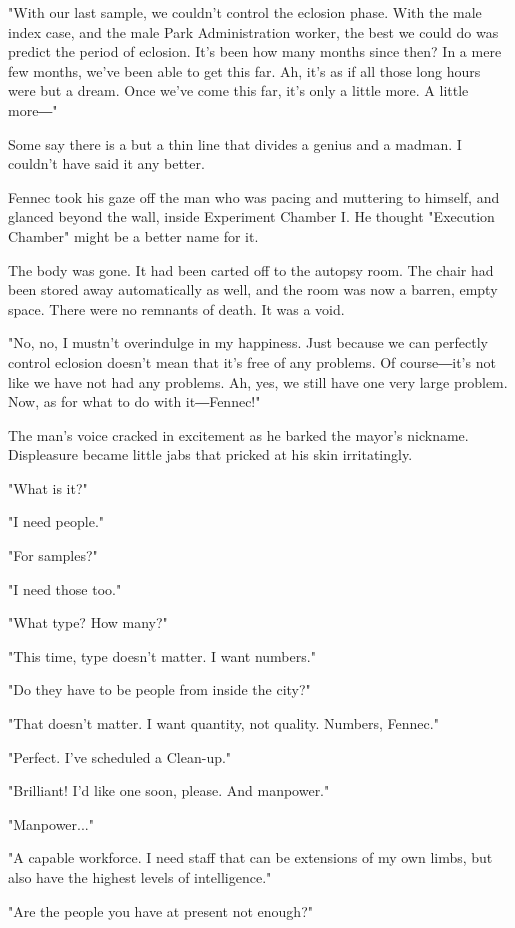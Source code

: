 "With our last sample, we couldn't control the eclosion phase. With the
male index case, and the male Park Administration worker, the best we
could do was predict the period of eclosion. It's been how many months
since then? In a mere few months, we've been able to get this far. Ah,
it's as if all those long hours were but a dream. Once we've come this
far, it's only a little more. A little more―"

Some say there is a but a thin line that divides a genius and a madman.
I couldn't have said it any better.

Fennec took his gaze off the man who was pacing and muttering to
himself, and glanced beyond the wall, inside Experiment Chamber I. He
thought "Execution Chamber" might be a better name for it.~

The body was gone. It had been carted off to the autopsy room. The chair
had been stored away automatically as well, and the room was now a
barren, empty space. There were no remnants of death. It was a void.

"No, no, I mustn't overindulge in my happiness. Just because we can
perfectly control eclosion doesn't mean that it's free of any problems.
Of course―it's not like we have not had any problems. Ah, yes, we still
have one very large problem. Now, as for what to do with it―Fennec!"

The man's voice cracked in excitement as he barked the mayor's nickname.
Displeasure became little jabs that pricked at his skin irritatingly.

"What is it?"

"I need people."

"For samples?"

"I need those too."

"What type? How many?"

"This time, type doesn't matter. I want numbers."

"Do they have to be people from inside the city?"

"That doesn't matter. I want quantity, not quality. Numbers, Fennec."

"Perfect. I've scheduled a Clean-up."

"Brilliant! I'd like one soon, please. And manpower."

"Manpower..."

"A capable workforce. I need staff that can be extensions of my own
limbs, but also have the highest levels of intelligence."

"Are the people you have at present not enough?"


